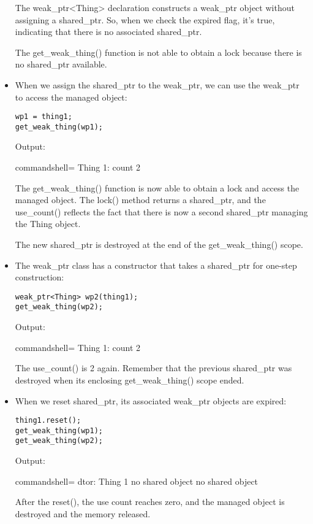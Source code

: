 \begin{itemize}
The weak\_ptr<Thing> declaration constructs a weak\_ptr object without assigning a shared\_ptr. So, when we check the expired flag, it's true, indicating that there is no associated shared\_ptr.

The get\_weak\_thing() function is not able to obtain a lock because there is no shared\_ptr available.

\item 
When we assign the shared\_ptr to the weak\_ptr, we can use the weak\_ptr to access the managed object:

\begin{lstlisting}[style=styleCXX]
wp1 = thing1;
get_weak_thing(wp1);
\end{lstlisting}

Output:

\begin{tcblisting}{commandshell={}}
Thing 1: count 2
\end{tcblisting}

The get\_weak\_thing() function is now able to obtain a lock and access the managed object. The lock() method returns a shared\_ptr, and the use\_count() reflects the fact that there is now a second shared\_ptr managing the Thing object.

The new shared\_ptr is destroyed at the end of the get\_weak\_thing() scope.

\item 
The weak\_ptr class has a constructor that takes a shared\_ptr for one-step construction:

\begin{lstlisting}[style=styleCXX]
weak_ptr<Thing> wp2(thing1);
get_weak_thing(wp2);
\end{lstlisting}

Output:

\begin{tcblisting}{commandshell={}}
Thing 1: count 2
\end{tcblisting}

The use\_count() is 2 again. Remember that the previous shared\_ptr was destroyed when its enclosing get\_weak\_thing() scope ended.

\item 
When we reset shared\_ptr, its associated weak\_ptr objects are expired:

\begin{lstlisting}[style=styleCXX]
thing1.reset();
get_weak_thing(wp1);
get_weak_thing(wp2);
\end{lstlisting}

Output:

\begin{tcblisting}{commandshell={}}
dtor: Thing 1
no shared object
no shared object
\end{tcblisting}

After the reset(), the use count reaches zero, and the managed object is destroyed and the memory released.
\end{itemize}


